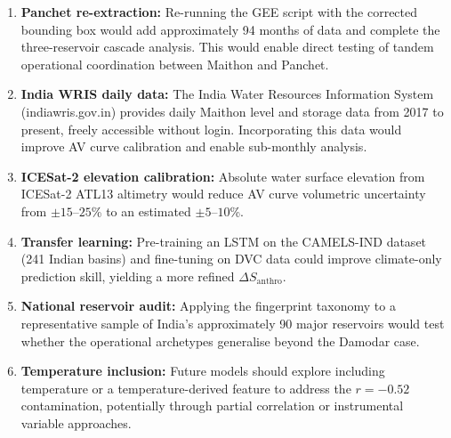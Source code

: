 \documentclass[12pt,a4paper,oneside]{report}
\newcommand{\dSanthro}{\Delta S_{\mathrm{anthro}}}
\begin{document}
\begin{enumerate}[leftmargin=*]
  \item \textbf{Panchet re-extraction:} Re-running the GEE script with the
    corrected bounding box would add approximately 94 months of data and
    complete the three-reservoir cascade analysis. This would enable direct
    testing of tandem operational coordination between Maithon and Panchet.

  \item \textbf{India WRIS daily data:} The India Water Resources
    Information System (indiawris.gov.in) provides daily Maithon level and
    storage data from 2017 to present, freely accessible without login.
    Incorporating this data would improve AV curve calibration and enable
    sub-monthly analysis.

  \item \textbf{ICESat-2 elevation calibration:} Absolute water surface
    elevation from ICESat-2 ATL13 altimetry would reduce AV curve
    volumetric uncertainty from $\pm 15$--$25$\% to an estimated
    $\pm 5$--$10$\%.

  \item \textbf{Transfer learning:} Pre-training an LSTM on the CAMELS-IND
    dataset (241 Indian basins) and fine-tuning on DVC data could improve
    climate-only prediction skill, yielding a more refined $\dSanthro$.

  \item \textbf{National reservoir audit:} Applying the fingerprint taxonomy
    to a representative sample of India's approximately 90 major reservoirs
    would test whether the operational archetypes generalise beyond the
    Damodar case.

  \item \textbf{Temperature inclusion:} Future models should explore
    including temperature or a temperature-derived feature to address
    the $r = -0.52$ contamination, potentially through partial correlation
    or instrumental variable approaches.
\end{enumerate}




\end{document}
